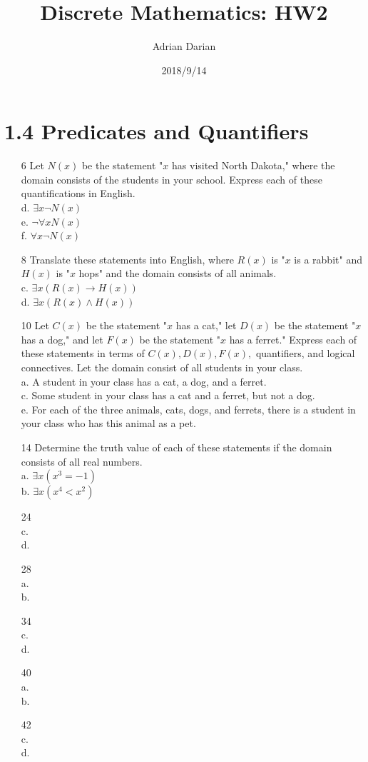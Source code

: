 \documentclass[a4paper]{article}
\title{Discrete Mathematics: HW2}
\author{Adrian Darian}
\date{2018/9/14}
\begin{document}
  
  \maketitle
  
  \section*{1.4 Predicates and Quantifiers}
  \begin{itemize}
    \item[6] Let $N(x)$ be the statement "$x$ has visited North Dakota," where the domain consists of the students in your school. Express each of these quantifications in English. \\
      d. $\exists x \neg N(x)$ \\
      e. $\neg \forall x N(x)$ \\
      f. $\forall x \neg N(x)$
    \item[8] Translate these statements into English, where $R(x)$ is "$x$ is a rabbit" and $H(x)$ is "$x$ hops" and the domain consists of all animals. \\
      c. $\exists x (R(x) \rightarrow H(x))$ \\
      d. $\exists x (R(x) \land H(x))$
    \item[10] Let $C(x)$ be the statement "$x$ has a cat," let $D(x)$ be the statement "$x$ has a dog," and let $F(x)$ be the statement "$x$ has a ferret." Express each of these statements in terms of $C(x), D(x), F(x),$ quantifiers, and logical connectives. Let the domain consist of all students in your class. \\
      a. A student in your class has a cat, a dog, and a ferret. \\
      c. Some student in your class has a cat and a ferret, but not a dog. \\
      e. For each of the three animals, cats, dogs, and ferrets, there is a student in your class who has this animal as a pet.
    \item[14] Determine the truth value of each of these statements if the domain consists of all real numbers. \\
      a. $\exists x(x^3 = -1)$ \\
      b. $\exists x(x^4 < x^2)$ 
    \item[24] \\
      c. \\
      d.
    \item[28] \\
      a. \\
      b.
    \item[34] \\
      c. \\
      d.
    \item[40] \\
      a. \\
      b.
    \item[42] \\
      c. \\
      d.
  \end{itemize}
\end{document}

